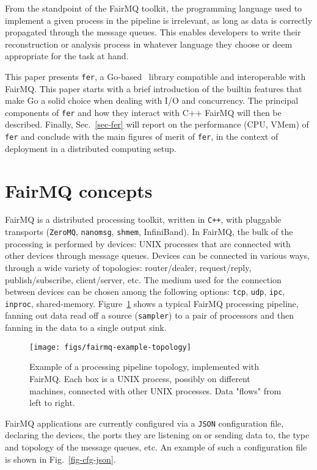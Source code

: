 \documentclass{webofc}
\begin{document}
From the standpoint of the FairMQ toolkit, the programming language used to implement a given process in the pipeline is irrelevant, as long as data is correctly propagated through the message queues. 
This enables developers to write their reconstruction or analysis process in whatever language they choose or deem appropriate for the task at hand.

This paper presents \texttt{fer}, a Go-based~\cite{ref-golang} library compatible and interoperable with FairMQ.
This paper starts with a brief introduction of the builtin features that make Go a solid choice when dealing with I/O and concurrency.
The principal components of \texttt{fer} and how they interact with C++ FairMQ will then be described.
Finally, Sec.~\ref{sec-fer} will report on the performance (CPU, VMem) of \texttt{fer} and conclude with the main figures of merit of \texttt{fer}, in the context of deployment in a distributed computing setup.

\section{FairMQ concepts}
\label{sec-fairmq-concepts}

FairMQ is a distributed processing toolkit, written in \texttt{C++}, with pluggable transports (\texttt{ZeroMQ}, \texttt{nanomsg}, \texttt{shmem}, InfiniBand).
In FairMQ, the bulk of the processing is performed by devices: UNIX processes that are connected with other devices through message queues.
Devices can be connected in various ways, through a wide variety of topologies: router/dealer, request/reply, publish/subscribe, client/server, etc.
The medium used for the connection between devices can be chosen among the following options: \texttt{tcp}, \texttt{udp}, \texttt{ipc}, \texttt{inproc}, shared-memory.
Figure~\ref{fig-topology} shows a typical FairMQ processing pipeline, fanning out data read off a source (\texttt{sampler}) to a pair of processors and then fanning in the data to a single output sink.

\begin{figure}[h]
\centering
\texttt{[image: figs/fairmq-example-topology]}
\caption{Example of a processing pipeline topology, implemented with FairMQ. Each box is a UNIX process, possibly on different machines, connected with other UNIX processes. Data "flows" from left to right.}
\label{fig-topology}
\end{figure}

FairMQ applications are currently configured via a \texttt{JSON} configuration file, declaring the devices, the ports they are listening on or sending data to, the type and topology of the message queues, etc.
An example of such a configuration file is shown in Fig.~\ref{fig-cfg-json}.
\end{document}
